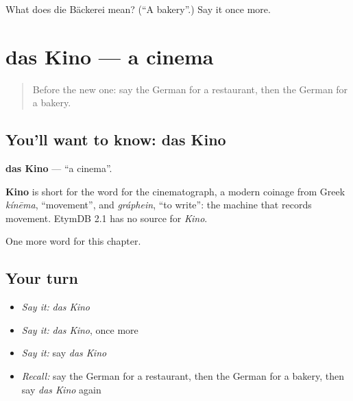 \begin{tcolorbox}[breakable,colback=teal!4,colframe=teal!35!black,title={Before you move on}]
What does die Bäckerei mean? (\textquotedblleft{}A bakery\textquotedblright{}.) Say it once more.
\end{tcolorbox}
\section[das Kino]{das Kino — a cinema}

\label{lesson:GE-C105-kino}



\begin{quote}
Before the new one: say the German for a restaurant, then the German for a bakery.
\end{quote}

\subsection*{You'll want to know: das Kino}
\textbf{das Kino} — \textquotedblleft{}a cinema\textquotedblright{}.

\begin{cousinweb}
\textbf{Kino} is short for the word for the cinematograph, a modern coinage from Greek \emph{kínēma}, \textquotedblleft{}movement\textquotedblright{}, and \emph{gráphein}, \textquotedblleft{}to write\textquotedblright{}: the machine that records movement. EtymDB 2.1 has no source for \emph{Kino}.
\end{cousinweb}

\begin{grammarlens}[title={What you've built}]
One more word for this chapter.
\end{grammarlens}

\subsection*{Your turn}
\begin{itemize}
\raggedright
  \item \emph{Say it:} \emph{das Kino}
  \item \emph{Say it:} \emph{das Kino}, once more
  \item \emph{Say it:} say \emph{das Kino}
  \item \emph{Recall:} say the German for a restaurant, then the German for a bakery, then say \emph{das Kino} again
\end{itemize}

